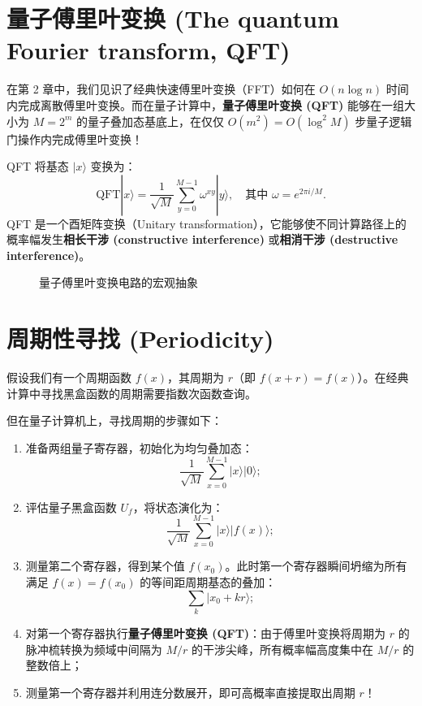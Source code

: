 \section{量子傅里叶变换 (The quantum Fourier transform, QFT)}

在第 2 章中，我们见识了经典快速傅里叶变换（FFT）如何在 $O(n \log n)$ 时间内完成离散傅里叶变换。而在量子计算中，\textbf{量子傅里叶变换 (QFT)} 能够在一组大小为 $M = 2^m$ 的量子叠加态基底上，在仅仅 $O(m^2) = O(\log^2 M)$ 步量子逻辑门操作内完成傅里叶变换！

QFT 将基态 $|x\rangle$ 变换为：
\[
\text{QFT} |x\rangle = \frac{1}{\sqrt{M}} \sum_{y=0}^{M-1} \omega^{xy} |y\rangle, \quad \text{其中 } \omega = e^{2\pi i / M}.
\]
QFT 是一个酉矩阵变换（Unitary transformation），它能够使不同计算路径上的概率幅发生\textbf{相长干涉 (constructive interference)} 或\textbf{相消干涉 (destructive interference)}。

\begin{figure}[htbp]
\centering
{}
\caption{量子傅里叶变换电路的宏观抽象}
\label{fig:qft_block}
\end{figure}

\section{周期性寻找 (Periodicity)}

假设我们有一个周期函数 $f(x)$，其周期为 $r$（即 $f(x + r) = f(x)$）。在经典计算中寻找黑盒函数的周期需要指数次函数查询。

但在量子计算机上，寻找周期的步骤如下：
\begin{enumerate}
    \item 准备两组量子寄存器，初始化为均匀叠加态：
    \[
    \frac{1}{\sqrt{M}} \sum_{x=0}^{M-1} |x\rangle |0\rangle;
    \]
    \item 评估量子黑盒函数 $U_f$，将状态演化为：
    \[
    \frac{1}{\sqrt{M}} \sum_{x=0}^{M-1} |x\rangle |f(x)\rangle;
    \]
    \item 测量第二个寄存器，得到某个值 $f(x_0)$。此时第一个寄存器瞬间坍缩为所有满足 $f(x) = f(x_0)$ 的等间距周期基态的叠加：
    \[
    \sum_{k} |x_0 + k r\rangle;
    \]
    \item 对第一个寄存器执行\textbf{量子傅里叶变换 (QFT)}：由于傅里叶变换将周期为 $r$ 的脉冲梳转换为频域中间隔为 $M/r$ 的干涉尖峰，所有概率幅高度集中在 $M/r$ 的整数倍上；
    \item 测量第一个寄存器并利用连分数展开，即可高概率直接提取出周期 $r$！
\end{enumerate}

